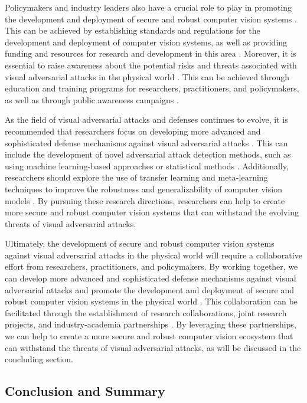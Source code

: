 \documentclass[11pt]{article}
\begin{document}
Policymakers and industry leaders also have a crucial role to play in promoting the development and deployment of secure and robust computer vision systems \cite{ref160}. This can be achieved by establishing standards and regulations for the development and deployment of computer vision systems, as well as providing funding and resources for research and development in this area \cite{ref148}. Moreover, it is essential to raise awareness about the potential risks and threats associated with visual adversarial attacks in the physical world \cite{ref3}. This can be achieved through education and training programs for researchers, practitioners, and policymakers, as well as through public awareness campaigns \cite{ref235}.

As the field of visual adversarial attacks and defenses continues to evolve, it is recommended that researchers focus on developing more advanced and sophisticated defense mechanisms against visual adversarial attacks \cite{ref212}. This can include the development of novel adversarial attack detection methods, such as using machine learning-based approaches or statistical methods \cite{ref236}. Additionally, researchers should explore the use of transfer learning and meta-learning techniques to improve the robustness and generalizability of computer vision models \cite{ref237}. By pursuing these research directions, researchers can help to create more secure and robust computer vision systems that can withstand the evolving threats of visual adversarial attacks.

Ultimately, the development of secure and robust computer vision systems against visual adversarial attacks in the physical world will require a collaborative effort from researchers, practitioners, and policymakers. By working together, we can develop more advanced and sophisticated defense mechanisms against visual adversarial attacks and promote the development and deployment of secure and robust computer vision systems in the physical world \cite{ref238}. This collaboration can be facilitated through the establishment of research collaborations, joint research projects, and industry-academia partnerships \cite{ref239}. By leveraging these partnerships, we can help to create a more secure and robust computer vision ecosystem that can withstand the threats of visual adversarial attacks, as will be discussed in the concluding section.

\subsection{Conclusion and Summary}
\end{document}
